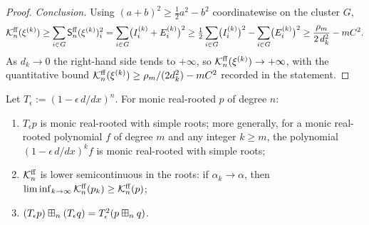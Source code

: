 \begin{proof}
\smallskip\noindent\emph{Conclusion.}
Using $(a+b)^2\ge\tfrac12 a^2-b^2$ coordinatewise on the cluster $G$,
\[
\mathcal{K}^{\mathrm{ff}}_n(\xi^{(k)})\ge\sum_{i\in G}\mathsf{S}^{\mathrm{ff}}_n(\xi^{(k)})_i^2
=\sum_{i\in G}\bigl(I^{(k)}_i+E^{(k)}_i\bigr)^2
\ge\tfrac12\sum_{i\in G}\bigl(I^{(k)}_i\bigr)^2-\sum_{i\in G}\bigl(E^{(k)}_i\bigr)^2
\ge\frac{\rho_m}{2\,d_k^2}-mC^2 .
\]
As $d_k\to0$ the right-hand side tends to $+\infty$, so
$\mathcal{K}^{\mathrm{ff}}_n(\xi^{(k)})\to+\infty$, with the quantitative bound
$\mathcal{K}^{\mathrm{ff}}_n(\xi^{(k)})\ge\rho_m/(2d_k^2)-mC^2$ recorded in the statement.
\end{proof}


\begin{qfourlemma}\label{lem:simple}
Let $T_\epsilon:=(1-\epsilon\,d/dx)^n$. For monic real-rooted $p$ of degree $n$:
\begin{enumerate}\setlength\itemsep{2pt}
\item $T_\epsilon p$ is monic real-rooted with simple roots; more generally, for
a monic real-rooted polynomial $f$ of degree $m$ and any integer $k\ge m$, the
polynomial $(1-\epsilon\,d/dx)^k f$ is monic real-rooted with simple roots;
\item $\mathcal{K}^{\mathrm{ff}}_n$ is lower semicontinuous in the roots: if $\alpha_k\to\alpha$,
then $\liminf_{k\to\infty}\mathcal{K}^{\mathrm{ff}}_n(p_k)\ge\mathcal{K}^{\mathrm{ff}}_n(p)$;
\item $(T_\epsilon p)\boxplus_n(T_\epsilon q)=T_\epsilon^2(p\boxplus_n q)$.
\end{enumerate}
\end{qfourlemma}

